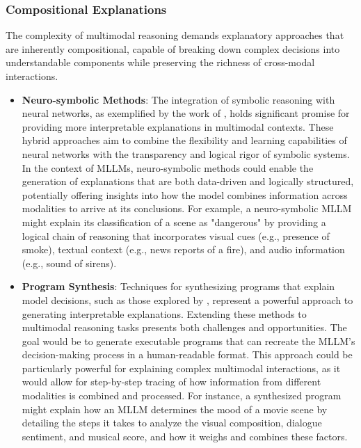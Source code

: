 \subsubsection{Compositional Explanations}
The complexity of multimodal reasoning demands explanatory approaches that are inherently compositional, capable of breaking down complex decisions into understandable components while preserving the richness of cross-modal interactions.

\begin{itemize}
    \item \textbf{Neuro-symbolic Methods}: The integration of symbolic reasoning with neural networks, as exemplified by the work of \citet{mao2019neuro}, holds significant promise for providing more interpretable explanations in multimodal contexts. These hybrid approaches aim to combine the flexibility and learning capabilities of neural networks with the transparency and logical rigor of symbolic systems. In the context of MLLMs, neuro-symbolic methods could enable the generation of explanations that are both data-driven and logically structured, potentially offering insights into how the model combines information across modalities to arrive at its conclusions. For example, a neuro-symbolic MLLM might explain its classification of a scene as "dangerous" by providing a logical chain of reasoning that incorporates visual cues (e.g., presence of smoke), textual context (e.g., news reports of a fire), and audio information (e.g., sound of sirens).

    \item \textbf{Program Synthesis}: Techniques for synthesizing programs that explain model decisions, such as those explored by \citet{ellis2018learning}, represent a powerful approach to generating interpretable explanations. Extending these methods to multimodal reasoning tasks presents both challenges and opportunities. The goal would be to generate executable programs that can recreate the MLLM's decision-making process in a human-readable format. This approach could be particularly powerful for explaining complex multimodal interactions, as it would allow for step-by-step tracing of how information from different modalities is combined and processed. For instance, a synthesized program might explain how an MLLM determines the mood of a movie scene by detailing the steps it takes to analyze the visual composition, dialogue sentiment, and musical score, and how it weighs and combines these factors.


\end{itemize}
